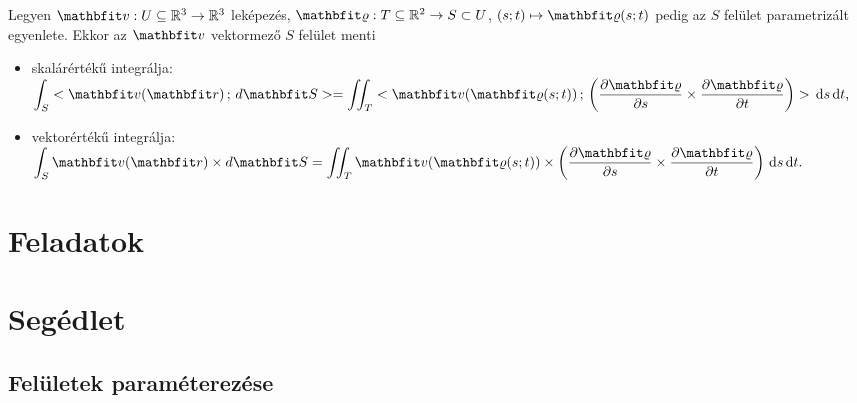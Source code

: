 \documentclass[lang=magyar]{math-handout}
\begin{document}
\vfill

\begin{definition}
  Legyen $\rvec v:  U \subseteq \mathbb R^3 \rightarrow \mathbb R^3$ leképezés,
  $\rvec \varrho: T \subseteq \mathbb R^2 \rightarrow S \subset U$, $(s;t)
    \mapsto \rvec \varrho(s;t)$ pedig az $S$ felület parametrizált egyenlete.
  Ekkor az $\rvec v$ vektormező $S$ felület menti
  \begin{itemize}
    \item skalárértékű integrálja:
          \(
            \displaystyle
            \int_S \scalar{\rvec v (\rvec r)}{d \rvec S} =
            \iint_T \scalar
            {\rvec v (\rvec \varrho(s; t))}
            {\left(\pdv{\rvec \varrho}{s} \times \pdv{\rvec \varrho}{t}\right)}
            \, \diff s \, \diff t
            \text,
          \)
    \item vektorértékű integrálja:
          \(
            \displaystyle
            \int_S \rvec v (\rvec r) \times d \rvec S =
            \iint_T {\rvec v (\rvec \varrho(s; t))} \times
            \left(\pdv{\rvec \varrho}{s} \times \pdv{\rvec \varrho}{t}\right)
            \, \diff s \, \diff t
            \text.
          \)

  \end{itemize}
\end{definition}

\clearpage
\section{Feladatok}

\clearpage
\section{Segédlet}

\subsection{Felületek paraméterezése}
\end{document}
